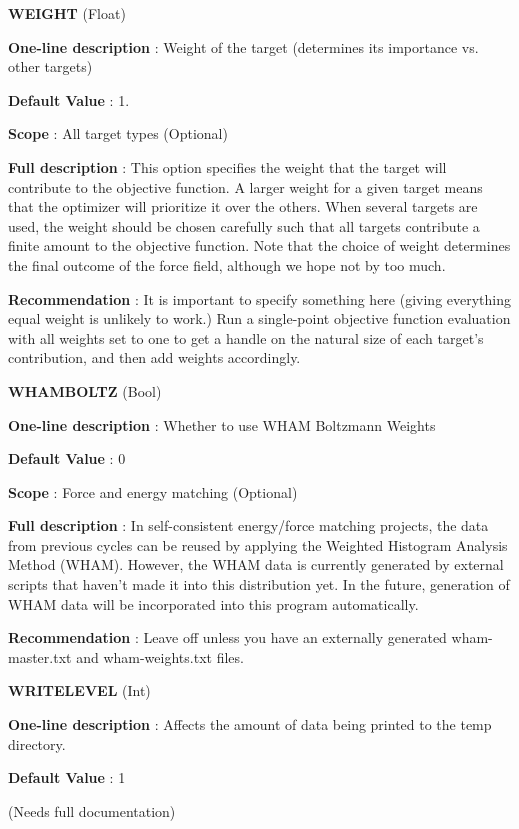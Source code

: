 \begin{DoxyItemize}
\item {\bfseries  \-W\-E\-I\-G\-H\-T } (\-Float) \par
{\bfseries  \-One-\/line description }\-: \-Weight of the target (determines its importance vs. other targets) \par
{\bfseries  \-Default \-Value }\-: 1. \par
{\bfseries  \-Scope }\-: \-All target types (\-Optional) \par
{\bfseries  \-Full description }\-: \-This option specifies the weight that the target will contribute to the objective function. \-A larger weight for a given target means that the optimizer will prioritize it over the others. \-When several targets are used, the weight should be chosen carefully such that all targets contribute a finite amount to the objective function. \-Note that the choice of weight determines the final outcome of the force field, although we hope not by too much. \par
{\bfseries  \-Recommendation }\-: \-It is important to specify something here (giving everything equal weight is unlikely to work.) \-Run a single-\/point objective function evaluation with all weights set to one to get a handle on the natural size of each target's contribution, and then add weights accordingly.\end{DoxyItemize}
\begin{DoxyItemize}
\item {\bfseries  \-W\-H\-A\-M\-B\-O\-L\-T\-Z } (\-Bool) \par
{\bfseries  \-One-\/line description }\-: \-Whether to use \-W\-H\-A\-M \-Boltzmann \-Weights \par
{\bfseries  \-Default \-Value }\-: 0 \par
{\bfseries  \-Scope }\-: \-Force and energy matching (\-Optional) \par
{\bfseries  \-Full description }\-: \-In self-\/consistent energy/force matching projects, the data from previous cycles can be reused by applying the \-Weighted \-Histogram \-Analysis \-Method (\-W\-H\-A\-M). \-However, the \-W\-H\-A\-M data is currently generated by external scripts that haven't made it into this distribution yet. \-In the future, generation of \-W\-H\-A\-M data will be incorporated into this program automatically. \par
{\bfseries  \-Recommendation }\-: \-Leave off unless you have an externally generated wham-\/master.\-txt and wham-\/weights.\-txt files.\end{DoxyItemize}
\begin{DoxyItemize}
\item {\bfseries  \-W\-R\-I\-T\-E\-L\-E\-V\-E\-L } (\-Int) \par
{\bfseries  \-One-\/line description }\-: \-Affects the amount of data being printed to the temp directory. \par
{\bfseries  \-Default \-Value }\-: 1 \par
(\-Needs full documentation)\end{DoxyItemize}

